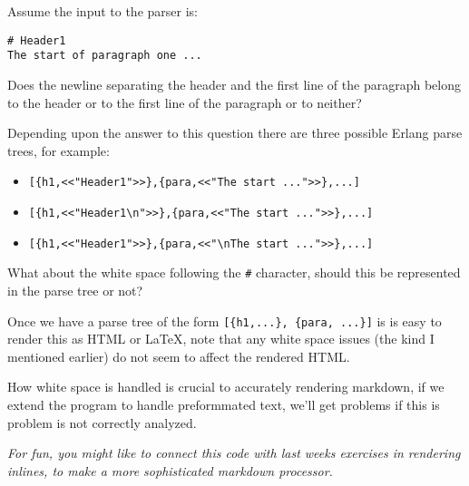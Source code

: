 \documentclass[12pt]{hitec}
\begin{document}
Assume the input to the parser is:

\begin{Verbatim}
# Header1
The start of paragraph one ...
\end{Verbatim}

Does the newline separating the header and the first line of the
paragraph belong to the header or to the first line of the paragraph or
to neither?

Depending upon the answer to this question there are three possible
Erlang  parse trees, for example:

\begin{itemize}
\item \verb+[{h1,<<"Header1">>},{para,<<"The start ...">>},...]+
\item \verb+[{h1,<<"Header1\n">>},{para,<<"The start ...">>},...]+
\item \verb+[{h1,<<"Header1">>},{para,<<"\nThe start ...">>},...]+
\end{itemize}

What about the white space following the \verb+#+ character,
should this be represented in the parse tree or not?

Once we have a parse tree of the form \verb+[{h1,...}, {para, ...}]+
is is easy to render this as HTML or \LaTeX{}, note that any white
space issues (the kind I mentioned earlier) do not seem to affect the
rendered HTML.

How white space is handled is crucial to accurately rendering markdown,
if we extend the program to handle preformmated text, we'll get
problems if this is problem is not correctly analyzed.

{\sl For fun, you might like to connect this code with last weeks
  exercises in rendering inlines, to make a more sophisticated markdown
  processor.}
\end{document}
